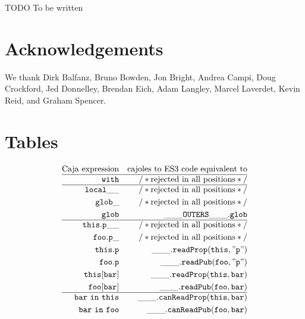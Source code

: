 \documentclass[letterpaper,twocolumn,10pt]{article}
\newcommand{\code}[1]{{\tt {#1}}}              %
\begin{document}
TODO To be written

\section{Acknowledgements}

We thank 
Dirk Balfanz,
Bruno Bowden,
Jon Bright,
Andrea Campi,
Doug Crockford,
Jed Donnelley,
Brendan Eich,
Adam Langley,
Marcel Laverdet,
Kevin Reid,
and
Graham Spencer.

\appendix

\section{Tables}

\begin{figure}
\begin{eqnarray}
  \mathrm{Caja\ expression} & \nonumber                 & \mathrm{cajoles\ to\ ES3\ code\ equivalent\ to} \\
  \hline
  \code{with}               & \label{with:bad}          & \mathrm{/*rejected\ in\ all\ positions*/} \\
  \hline
  \code{local\_\_}          & \label{var:bad-suffix}    & \mathrm{/*rejected\ in\ all\ positions*/} \\
  \code{glob\_}             & \label{var:bad-global-suffix} & \mathrm{/*rejected\ in\ all\ positions*/} \\
  \code{glob}               & \label{var:global}        & \code{\_\_\_OUTERS\_\_\_.glob} \\
  \hline
  \code{this.p\_\_}         & \label{read:bad-suffix}   & \mathrm{/*rejected\ in\ all\ positions*/} \\
  \code{foo.p\_}            & \label{read:bad-internal} & \mathrm{/*rejected\ in\ all\ positions*/} \\
  \code{this.p}             & \label{read:internal}     & \code{\_\_\_.readProp(this,"p")} \\
  \code{foo.p}              & \label{read:public}       & \code{\_\_\_.readPub(foo,"p")} \\
  \code{this[bar]}          & \label{read:index-internal} & \code{\_\_\_.readProp(this,bar)} \\
  \code{foo[bar]}           & \label{read:index-public} & \code{\_\_\_.readPub(foo,bar)} \\
  \hline
  \code{bar\ in\ this}      & \label{in:internal}       & \code{\_\_\_.canReadProp(this,bar)} \\
  \code{bar\ in\ foo}       & \label{in:public}         & \code{\_\_\_.canReadPub(foo,bar)} \\

\end{eqnarray}
\end{figure}
\end{document}
